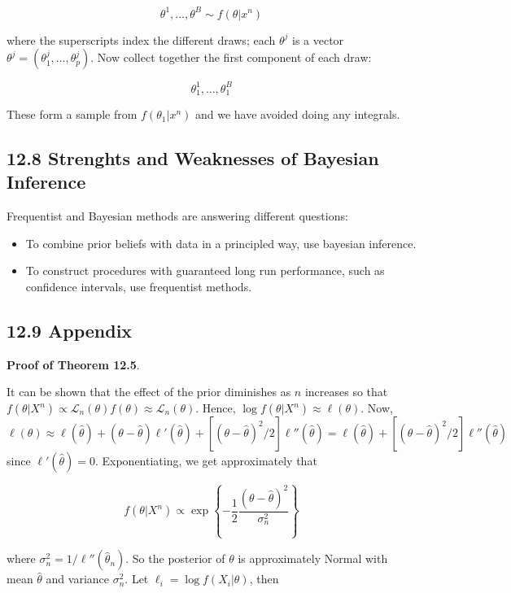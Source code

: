\[\theta^1, \dots, \theta^B \sim f(\theta | x^n)\]

where the superscripts index the different draws; each \(\theta^j\) is a
vector \(\theta^j = (\theta^j_1, \dots, \theta^j_p)\). Now collect
together the first component of each draw:

\[\theta^1_1, \dots, \theta^B_1\]

These form a sample from \(f(\theta_1 | x^n)\) and we have avoided doing
any integrals.

\subsection{12.8 Strenghts and Weaknesses of Bayesian
Inference}\label{strenghts-and-weaknesses-of-bayesian-inference}

Frequentist and Bayesian methods are answering different questions:

\begin{itemize}[tightlist]
\item
  To combine prior beliefs with data in a principled way, use bayesian
  inference.
\item
  To construct procedures with guaranteed long run performance, such as
  confidence intervals, use frequentist methods.
\end{itemize}

\subsection{12.9 Appendix}\label{appendix}

\textbf{Proof of Theorem 12.5}.

It can be shown that the effect of the prior diminishes as \(n\)
increases so that
\(f(\theta | X^n) \propto \mathcal{L}_n(\theta)f(\theta) \approx \mathcal{L}_n(\theta)\).
Hence, \(\log f(\theta | X^n) \approx \ell(\theta)\). Now,
\(\ell(\theta) \approx \ell(\hat{\theta}) + (\theta - \hat{\theta})\ell'(\hat{\theta}) + [(\theta - \hat{\theta})^2/2]\ell''(\hat{\theta}) = \ell(\hat{\theta}) + [(\theta - \hat{\theta})^2/2] \ell''(\hat{\theta})\)
since \(\ell'(\hat{\theta}) = 0\). Exponentiating, we get approximately
that

\[ f(\theta | X^n) \propto \exp \left\{ - \frac{1}{2} \frac{(\theta - \hat{\theta})^2}{\sigma_n^2} \right\} \]

where \(\sigma_n^2 = 1 / \ell''(\hat{\theta}_n)\). So the posterior of
\(\theta\) is approximately Normal with mean \(\hat{\theta}\) and
variance \(\sigma^2_n\). Let \(\ell_i = \log f(X_i | \theta)\), then

